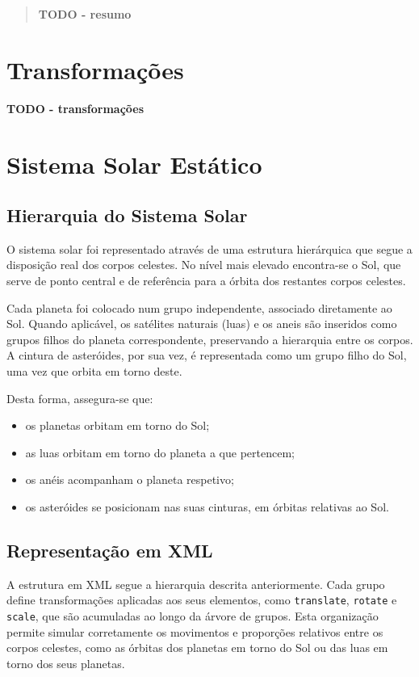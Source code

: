 \documentclass[12pt, a4paper]{article}
\begin{document}
\pagebreak

\begin{abstract}
    \textbf{\color{red} TODO - resumo}
\end{abstract}

\section{Transformações}

\textbf{\color{red} TODO - transformações}

\section{Sistema Solar Estático}

\subsection{Hierarquia do Sistema Solar}

O sistema solar foi representado através de uma estrutura hierárquica que segue a disposição
real
dos corpos celestes. No nível mais elevado encontra-se o Sol, que serve de ponto central e de
referência para a órbita dos restantes corpos celestes.

Cada planeta foi colocado num grupo independente, associado diretamente ao Sol. Quando aplicável,
os satélites naturais (luas) e os aneis são inseridos como grupos filhos do planeta
correspondente, preservando a hierarquia entre os corpos. A cintura de asteróides, por sua vez,
é representada como um grupo filho do Sol, uma vez que orbita em torno deste.

Desta forma, assegura-se que:
\begin{itemize}
    \item os planetas orbitam em torno do Sol;
    \item as luas orbitam em torno do planeta a que pertencem;
    \item os anéis acompanham o planeta respetivo;
    \item os asteróides se posicionam nas suas cinturas, em órbitas relativas ao Sol.
\end{itemize}

\subsection{Representação em XML}

A estrutura em XML segue a hierarquia descrita anteriormente. Cada grupo define transformações
aplicadas aos seus elementos, como \texttt{translate}, \texttt{rotate} e \texttt{scale}, que são
acumuladas ao longo da árvore de grupos. Esta organização permite simular corretamente os
movimentos
e proporções relativos entre os corpos celestes, como as órbitas dos planetas em torno do Sol
ou
das luas em torno dos seus planetas.
\end{document}
